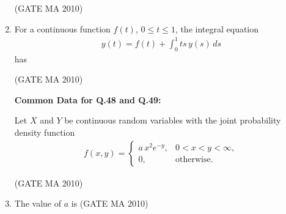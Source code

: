 \documentclass[journal,12pt,onecolumn]{IEEEtran}
\theoremstyle{remark}
\begin{document}
\begin{flushleft}
\begin{enumerate}
\hfill(GATE MA 2010)

\begin{enumerate}
\end{enumerate}
\newpage
\item For a continuous function $f(t)$, $0\leq t\leq 1$, the integral equation 
\begin{align*}
y(t)=f(t)+\int_0^1 ts\,y(s)\,ds
\end{align*}
has

\hfill(GATE MA 2010)

\begin{enumerate}
\end{enumerate}
\textbf{Common Data for Q.48 and Q.49: }

Let $X$ and $Y$ be continuous random variables with the joint probability density function
\begin{align*}
f(x,y)=
\begin{cases}
a\,x^{2}e^{-y}, & 0<x<y<\infty,\\
0, & \text{otherwise}.
\end{cases}
\end{align*}

\hfill(GATE MA 2010)

\item The value of $a$ is
\hfill(GATE MA 2010)
\begin{enumerate}
\end{enumerate}


\end{enumerate}
\end{flushleft}
\end{document}

